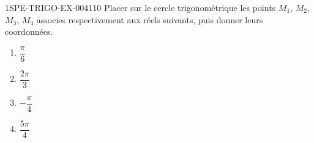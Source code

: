 \begin{exercice}{1SPE-TRIGO-EX-004}{1}{10}
Placer sur le cercle trigonométrique les points $M_1$, $M_2$, $M_3$, $M_4$ associes respectivement aux réels suivants, puis donner leurs coordonnées.
\begin{enumerate}
  \item $\dfrac{\pi}{6}$
  \item $\dfrac{2\pi}{3}$
  \item $-\dfrac{\pi}{4}$
  \item $\dfrac{5\pi}{4}$
\end{enumerate}
\end{exercice}
